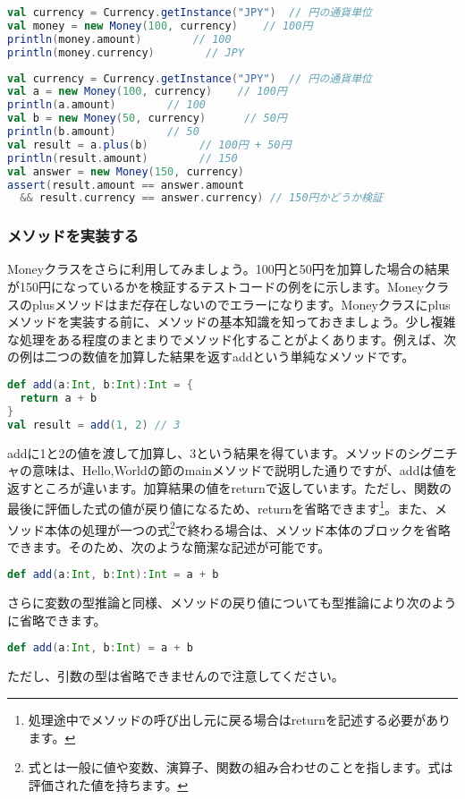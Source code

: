 \begin{lstlisting}[language=scala, label=src:money_100yen, caption=100円を表すコード]
val currency = Currency.getInstance("JPY")  // 円の通貨単位
val money = new Money(100, currency)    // 100円
println(money.amount)        // 100
println(money.currency)        // JPY
\end{lstlisting}

\begin{lstlisting}[language=scala, label=src:money_test, caption=100円と50円を加算した結果が150円になっているかを検証するテストコード。Moneyクラスのplusメソッドはまだ存在しないので実行するとエラーになる]
val currency = Currency.getInstance("JPY")  // 円の通貨単位
val a = new Money(100, currency)    // 100円
println(a.amount)        // 100
val b = new Money(50, currency)      // 50円
println(b.amount)        // 50
val result = a.plus(b)        // 100円 + 50円
println(result.amount)        // 150
val answer = new Money(150, currency)
assert(result.amount == answer.amount
  && result.currency == answer.currency) // 150円かどうか検証
\end{lstlisting}

\subsubsection{メソッドを実装する}
Moneyクラスをさらに利用してみましょう。100円と50円を加算した場合の結果が150円になっているかを検証するテストコードの例をに示します。Moneyクラスのplusメソッドはまだ存在しないのでエラーになります。Moneyクラスにplusメソッドを実装する前に、メソッドの基本知識を知っておきましょう。少し複雑な処理をある程度のまとまりでメソッド化することがよくあります。例えば、次の例は二つの数値を加算した結果を返すaddという単純なメソッドです。
\begin{lstlisting}[language=scala, frame=none]
def add(a:Int, b:Int):Int = {
  return a + b
}
val result = add(1, 2) // 3
\end{lstlisting}
addに1と2の値を渡して加算し、3という結果を得ています。メソッドのシグニチャの意味は、Hello,Worldの節のmainメソッドで説明した通りですが、addは値を返すところが違います。加算結果の値をreturnで返しています。ただし、関数の最後に評価した式の値が戻り値になるため、returnを省略できます\footnote{処理途中でメソッドの呼び出し元に戻る場合はreturnを記述する必要があります。}。また、メソッド本体の処理が一つの式\footnote{式とは一般に値や変数、演算子、関数の組み合わせのことを指します。式は評価された値を持ちます。}で終わる場合は、メソッド本体のブロックを省略できます。そのため、次のような簡潔な記述が可能です。
\begin{lstlisting}[language=scala, frame=none]
def add(a:Int, b:Int):Int = a + b
\end{lstlisting}
さらに変数の型推論と同様、メソッドの戻り値についても型推論により次のように省略できます。
\begin{lstlisting}[language=scala, frame=none]
def add(a:Int, b:Int) = a + b
\end{lstlisting}
ただし、引数の型は省略できませんので注意してください。

